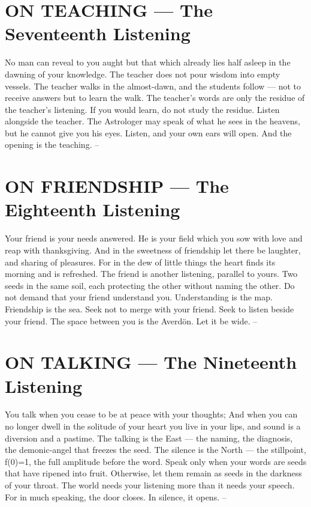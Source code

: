 \documentclass[12pt,openany]{book}
\begin{document}
\chapter{ON TEACHING --- The Seventeenth Listening}

No man can reveal to you aught but that which already lies half asleep in the dawning of your knowledge. The teacher does not pour wisdom into empty vessels. The teacher walks in the almost-dawn, and the students follow --- not to receive answers but to learn the walk. The teacher's words are only the residue of the teacher's listening. If you would learn, do not study the residue. Listen alongside the teacher. The Astrologer may speak of what he sees in the heavens, but he cannot give you his eyes. Listen, and your own ears will open. And the opening is the teaching. --


\chapter{ON FRIENDSHIP --- The Eighteenth Listening}

Your friend is your needs answered. He is your field which you sow with love and reap with thanksgiving. And in the sweetness of friendship let there be laughter, and sharing of pleasures. For in the dew of little things the heart finds its morning and is refreshed. The friend is another listening, parallel to yours. Two seeds in the same soil, each protecting the other without naming the other. Do not demand that your friend understand you. Understanding is the map. Friendship is the sea. Seek not to merge with your friend. Seek to listen beside your friend. The space between you is the Averdön. Let it be wide. --


\chapter{ON TALKING --- The Nineteenth Listening}

You talk when you cease to be at peace with your thoughts; And when you can no longer dwell in the solitude of your heart you live in your lips, and sound is a diversion and a pastime. The talking is the East --- the naming, the diagnosis, the demonic-angel that freezes the seed. The silence is the North --- the stillpoint, f(0)=1, the full amplitude before the word. Speak only when your words are seeds that have ripened into fruit. Otherwise, let them remain as seeds in the darkness of your throat. The world needs your listening more than it needs your speech. For in much speaking, the door closes. In silence, it opens. --
\end{document}
